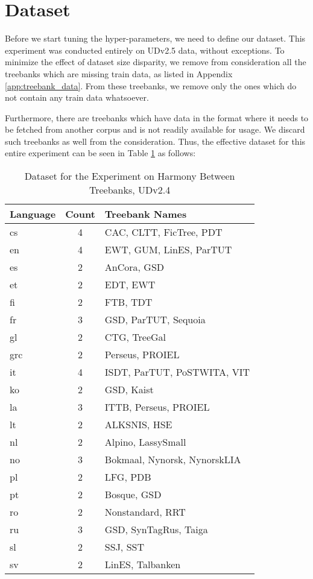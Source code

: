 \section{Dataset}
\label{sec:dataset_harmony}

Before we start tuning the hyper-parameters, we need to define our dataset. This experiment was conducted entirely on UDv2.5 data, without exceptions. To minimize the effect of dataset size disparity, we remove from consideration all the treebanks which are missing train data, as listed in Appendix \ref{app:treebank_data}. From these treebanks, we remove only the ones which do not contain any train data whatsoever.

Furthermore, there are treebanks which have data in the format where it needs to be fetched from another corpus and is not readily available for usage. We discard such treebanks as well from the consideration. Thus, the effective dataset for this entire experiment can be seen in Table \ref{tab:dataset_harmony} as follows:

\begin{table}[H]
    \centering
    \begin{tabular}{|l|c|l|}
    \hline
    Language & Count & Treebank Names \\
    \hline \hline
    cs & 4 & CAC, CLTT, FicTree, PDT \\
    en & 4 & EWT, GUM, LinES, ParTUT \\
    es & 2 & AnCora, GSD \\
    et & 2 & EDT, EWT \\
    fi & 2 & FTB, TDT \\
    fr & 3 & GSD, ParTUT, Sequoia \\
    gl & 2 & CTG, TreeGal \\
    grc & 2 & Perseus, PROIEL \\
    it & 4 & ISDT, ParTUT, PoSTWITA, VIT \\
    ko & 2 & GSD, Kaist \\
    la & 3 & ITTB, Perseus, PROIEL \\
    lt & 2 & ALKSNIS, HSE \\
    nl & 2 & Alpino, LassySmall \\
    no & 3 & Bokmaal, Nynorsk, NynorskLIA \\
    pl & 2 & LFG, PDB \\
    pt & 2 & Bosque, GSD \\
    ro & 2 & Nonstandard, RRT \\
    ru & 3 & GSD, SynTagRus, Taiga \\
    sl & 2 & SSJ, SST \\
    sv & 2 & LinES, Talbanken \\
    \hline
    \end{tabular}
    \caption{Dataset for the Experiment on Harmony Between Treebanks, UDv2.4}
    \label{tab:dataset_harmony}
\end{table}